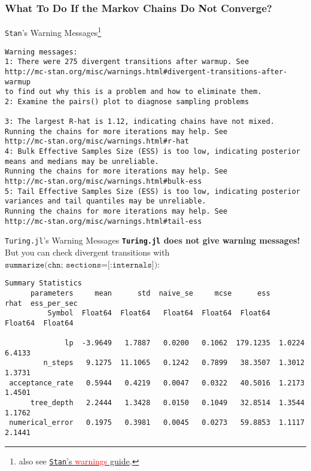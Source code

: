 \subsubsection{What To Do If the Markov Chains Do Not Converge?}
\begin{frame}[fragile]{\texttt{Stan}'s Warning Messages\footnote{also see \href{https://mc-stan.org/misc/warnings.html}{\texttt{Stan}'s \textcolor{red}{warnings} guide}.}}
	\begin{lstlisting}[basicstyle=\footnotesize\color{red}]
Warning messages:
1: There were 275 divergent transitions after warmup. See
http://mc-stan.org/misc/warnings.html#divergent-transitions-after-warmup
to find out why this is a problem and how to eliminate them.
2: Examine the pairs() plot to diagnose sampling problems

3: The largest R-hat is 1.12, indicating chains have not mixed.
Running the chains for more iterations may help. See
http://mc-stan.org/misc/warnings.html#r-hat
4: Bulk Effective Samples Size (ESS) is too low, indicating posterior
means and medians may be unreliable.
Running the chains for more iterations may help. See
http://mc-stan.org/misc/warnings.html#bulk-ess
5: Tail Effective Samples Size (ESS) is too low, indicating posterior
variances and tail quantiles may be unreliable.
Running the chains for more iterations may help. See
http://mc-stan.org/misc/warnings.html#tail-ess
  \end{lstlisting}
\end{frame}

\begin{frame}[fragile]{\texttt{Turing.jl}'s Warning Messages}
	\textbf{\texttt{Turing.jl} does not give warning messages!}
	But you can check divergent transitions with $\texttt{summarize(chn; sections=[:internals])}$:
	\vfill
	\begin{lstlisting}[basicstyle=\footnotesize]
Summary Statistics
      parameters     mean      std  naive_se     mcse      ess     rhat  ess_per_sec
          Symbol  Float64  Float64   Float64  Float64  Float64  Float64  Float64

              lp  -3.9649   1.7887   0.0200   0.1062  179.1235  1.0224   6.4133
         n_steps   9.1275  11.1065   0.1242   0.7899   38.3507  1.3012   1.3731
 acceptance_rate   0.5944   0.4219   0.0047   0.0322   40.5016  1.2173   1.4501
      tree_depth   2.2444   1.3428   0.0150   0.1049   32.8514  1.3544   1.1762
 numerical_error   0.1975   0.3981   0.0045   0.0273   59.8853  1.1117   2.1441
  \end{lstlisting}
\end{frame}

